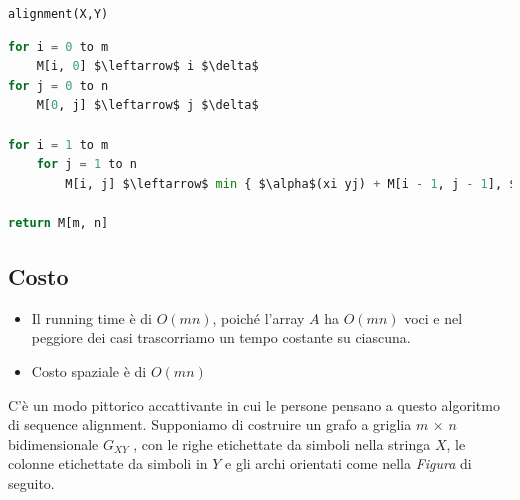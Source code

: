 \texttt{alignment(X,Y)}
\begin{lstlisting}[language=Python, mathescape=true]
for i = 0 to m
	M[i, 0] $\leftarrow$ i $\delta$
for j = 0 to n
	M[0, j] $\leftarrow$ j $\delta$
	
for i = 1 to m
	for j = 1 to n
		M[i, j] $\leftarrow$ min { $\alpha$(xi yj) + M[i - 1, j - 1], $\delta$ + M [i - 1, j], $\delta$ + M [i, j - 1] }
 		
return M[m, n]
\end{lstlisting}

\subsection{Costo}

\begin{itemize}
	\item
	      Il running time è di $O(mn)$, poiché l'array $A$ ha $O(mn)$ voci
	      e nel peggiore dei casi trascorriamo un tempo costante su ciascuna.
	\item
	      Costo spaziale è di $O(mn)$
\end{itemize}

C'è un modo pittorico accattivante in cui le persone pensano a questo
algoritmo di sequence alignment. Supponiamo di costruire un grafo a
griglia $m$ × $n$ bidimensionale $G_{XY}$ , con le righe
etichettate da simboli nella stringa $X$, le colonne etichettate da
simboli in $Y$ e gli archi orientati come nella \emph{Figura} di
seguito.

